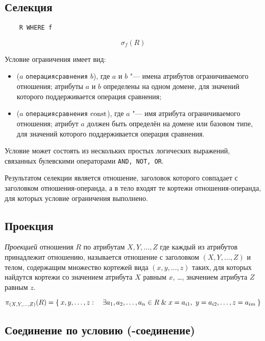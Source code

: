 \subsection*{Селекция}

\begin{verbatim}
	R WHERE f
\end{verbatim}

$$ \sigma_f(R) $$

Условие ограничения имеет вид:
\begin{itemize}
	\item ($ a $ \texttt{операция\textunderscore сравнения} $ b $), где $ a $ и $ b $ "--- имена атрибутов ограничиваемого отношения; атрибуты $ a $ и $ b $ определены на одном домене, для значений которого поддерживается операция сравнения;
	\item ($ a $ \texttt{операция\textunderscore сравнения} $ \operatorname{const} $), где $ a $ "--- имя атрибута ограничиваемого отношения; атрибут $ a $ должен быть определён на домене или базовом типе, для значений которого поддерживается операция сравнения.
\end{itemize}

Условие может состоять из нескольких простых логических выражений, связанных булевскими операторами \texttt{AND, NOT, OR}.

Результатом селекции является отношение, заголовок которого совпадает с заголовком отношения-операнда, а в тело входят те кортежи отношения-операнда, для которых условие ограничения выполнено.

\subsection*{Проекция}

\begin{definition}
	\emph{Проекцией} отношения $ R $ по атрибутам $ X, Y, \dots, Z $ где каждый из атрибутов принадлежит отношению, называется отношение с заголовком $ (X, Y, \dots, Z) $ и телом, содержащим множество кортежей вида $ (x, y, \dots, z) $ таких, для которых найдутся кортежи со значением атрибута $ X $ равным $ x $, \dots, значением атрибута $ Z $ равным $ z $.
\end{definition}

$$ \pi_{(X, Y, \dots, Z)}(R) = \Set{x, y, \dots, z : \quad \exists a_1, a_2, \dots, a_n \in R \ensuremath{\mathrel\&}x = a_{i1}, ~ y = a_{i2}, \dots, z = a_{im}} $$

\subsection*{Соединение по условию (-соединение)}

